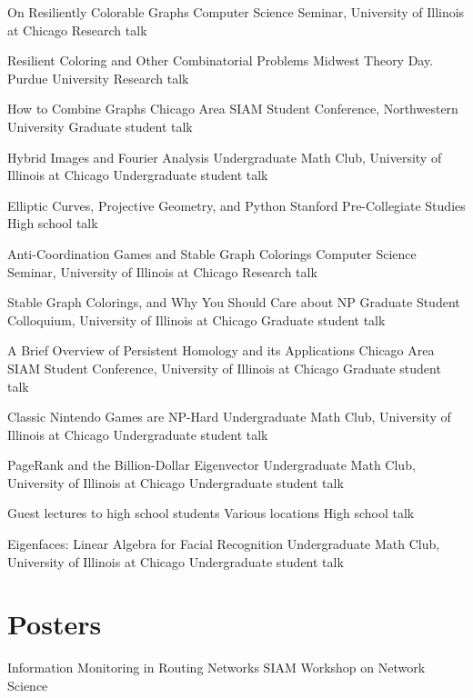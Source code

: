 \documentclass[11pt]{moderncv}
\begin{document}
  {On Resiliently Colorable Graphs}
  {Computer Science Seminar, University of Illinois at Chicago}
  {Research talk}
  {}
  {}

  {Resilient Coloring and Other Combinatorial Problems}
  {Midwest Theory Day. Purdue University}
  {Research talk}
  {}
  {}

  {How to Combine Graphs}
  {Chicago Area SIAM Student Conference, Northwestern University}
  {Graduate student talk}
  {}
  {}

  {Hybrid Images and Fourier Analysis}
  {Undergraduate Math Club, University of Illinois at Chicago}
  {Undergraduate student talk}
  {}
  {}

  {Elliptic Curves, Projective Geometry, and Python}
  {Stanford Pre-Collegiate Studies}
  {High school talk}
  {}
  {}

  {Anti-Coordination Games and Stable Graph Colorings}
  {Computer Science Seminar, University of Illinois at Chicago}
  {Research talk}
  {}
  {}

  {Stable Graph Colorings, and Why You Should Care about NP}
  {Graduate Student Colloquium, University of Illinois at Chicago}
  {Graduate student talk}
  {}
  {}

  {A Brief Overview of Persistent Homology and its Applications}
  {Chicago Area SIAM Student Conference, University of Illinois at Chicago}
  {Graduate student talk}
  {}
  {}

  {Classic Nintendo Games are NP-Hard}
  {Undergraduate Math Club, University of Illinois at Chicago}
  {Undergraduate student talk}
  {}
  {}

  {PageRank and the Billion-Dollar Eigenvector}
  {Undergraduate Math Club, University of Illinois at Chicago}
  {Undergraduate student talk}
  {}
  {}

  {Guest lectures to high school students}
  {Various locations}
  {High school talk}
  {}
  {}

  {Eigenfaces: Linear Algebra for Facial Recognition}
  {Undergraduate Math Club, University of Illinois at Chicago}
  {Undergraduate student talk}
  {}
  {}

\section{Posters}

  {Information Monitoring in Routing Networks}
  {}
  {SIAM Workshop on Network Science}
  {}
  {}
\end{document}
